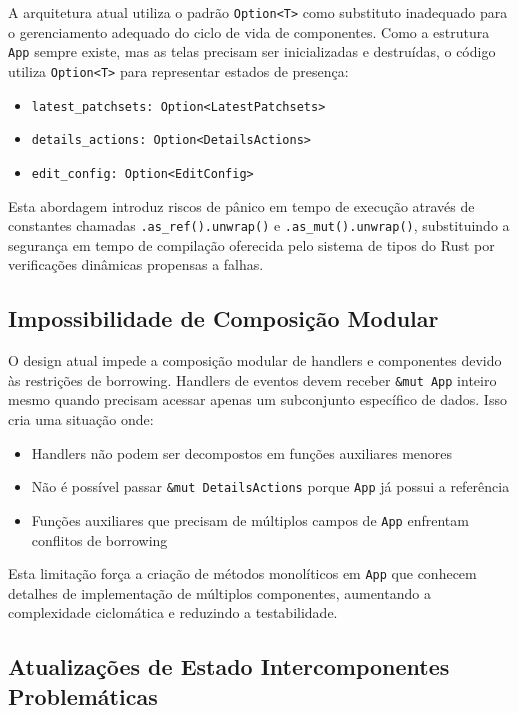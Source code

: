 A arquitetura atual utiliza o padrão \texttt{Option<T>} como substituto inadequado para o gerenciamento adequado do ciclo de vida de componentes. Como a estrutura \texttt{App} sempre existe, mas as telas precisam ser inicializadas e destruídas, o código utiliza \texttt{Option<T>} para representar estados de presença:

\begin{itemize}
    \item \texttt{latest\_patchsets: Option<LatestPatchsets>}
    \item \texttt{details\_actions: Option<DetailsActions>}
    \item \texttt{edit\_config: Option<EditConfig>}
\end{itemize}

Esta abordagem introduz riscos de pânico em tempo de execução através de constantes chamadas \texttt{.as\_ref().unwrap()} e \texttt{.as\_mut().unwrap()}, substituindo a segurança em tempo de compilação oferecida pelo sistema de tipos do Rust por verificações dinâmicas propensas a falhas.

\subsection{Impossibilidade de Composição Modular}

O design atual impede a composição modular de handlers e componentes devido às restrições de borrowing. Handlers de eventos devem receber \texttt{\&mut App} inteiro mesmo quando precisam acessar apenas um subconjunto específico de dados. Isso cria uma situação onde:

\begin{itemize}
    \item Handlers não podem ser decompostos em funções auxiliares menores
    \item Não é possível passar \texttt{\&mut DetailsActions} porque \texttt{App} já possui a referência
    \item Funções auxiliares que precisam de múltiplos campos de \texttt{App} enfrentam conflitos de borrowing
\end{itemize}

Esta limitação força a criação de métodos monolíticos em \texttt{App} que conhecem detalhes de implementação de múltiplos componentes, aumentando a complexidade ciclomática e reduzindo a testabilidade.

\subsection{Atualizações de Estado Intercomponentes Problemáticas}


